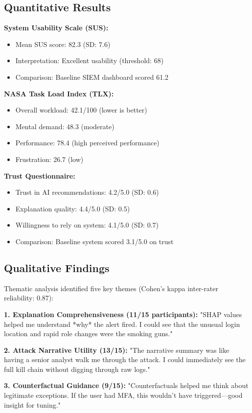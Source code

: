 \subsection{Quantitative Results}
\textbf{System Usability Scale (SUS):}
\begin{itemize}
    \item Mean SUS score: 82.3 (SD: 7.6)
    \item Interpretation: Excellent usability (threshold: 68)
    \item Comparison: Baseline SIEM dashboard scored 61.2
\end{itemize}

\textbf{NASA Task Load Index (TLX):}
\begin{itemize}
    \item Overall workload: 42.1/100 (lower is better)
    \item Mental demand: 48.3 (moderate)
    \item Performance: 78.4 (high perceived performance)
    \item Frustration: 26.7 (low)
\end{itemize}

\textbf{Trust Questionnaire:}
\begin{itemize}
    \item Trust in AI recommendations: 4.2/5.0 (SD: 0.6)
    \item Explanation quality: 4.4/5.0 (SD: 0.5)
    \item Willingness to rely on system: 4.1/5.0 (SD: 0.7)
    \item Comparison: Baseline system scored 3.1/5.0 on trust
\end{itemize}

\subsection{Qualitative Findings}
Thematic analysis identified five key themes (Cohen's kappa inter-rater reliability: 0.87):

\textbf{1. Explanation Comprehensiveness (11/15 participants):}
"SHAP values helped me understand *why* the alert fired. I could see that the unusual login location and rapid role changes were the smoking guns."

\textbf{2. Attack Narrative Utility (13/15):}
"The narrative summary was like having a senior analyst walk me through the attack. I could immediately see the full kill chain without digging through raw logs."

\textbf{3. Counterfactual Guidance (9/15):}
"Counterfactuals helped me think about legitimate exceptions. If the user had MFA, this wouldn't have triggered—good insight for tuning."

